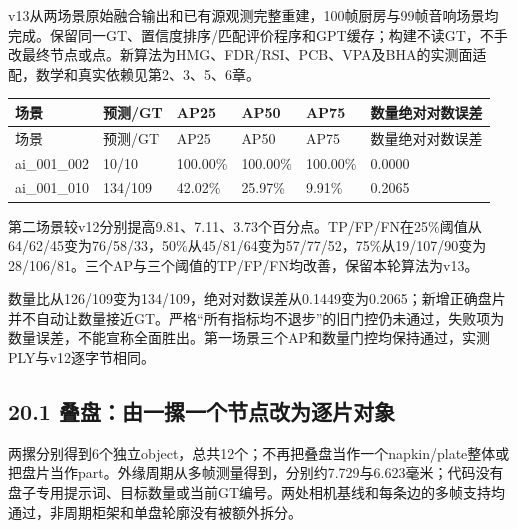 \documentclass[UTF8,fontset=fandol]{ctexart}
\begin{document}
v13从两场景原始融合输出和已有源观测完整重建，100帧厨房与99帧音响场景均完成。保留同一GT、置信度排序/匹配评价程序和GPT缓存；构建不读GT，不手改最终节点或点。新算法为HMG、FDR/RSI、PCB、VPA及BHA的实测面适配，数学和真实依赖见第2、3、5、6章。



{\small
\begin{longtable}{|p{}|p{}|p{}|p{}|p{}|p{}|}
\hline
场景 & 预测/GT & AP25 & AP50 & AP75 & 数量绝对对数误差 \\ \hline
\endfirsthead
\hline
场景 & 预测/GT & AP25 & AP50 & AP75 & 数量绝对对数误差 \\ \hline
\endhead
ai\_001\_002 & 10/10 & 100.00\% & 100.00\% & 100.00\% & 0.0000 \\ \hline
ai\_001\_010 & 134/109 & 42.02\% & 25.97\% & 9.91\% & 0.2065 \\ \hline
\end{longtable}
}

第二场景较v12分别提高9.81、7.11、3.73个百分点。TP/FP/FN在25\%阈值从64/62/45变为76/58/33，50\%从45/81/64变为57/77/52，75\%从19/107/90变为28/106/81。三个AP与三个阈值的TP/FP/FN均改善，保留本轮算法为v13。



数量比从126/109变为134/109，绝对对数误差从0.1449变为0.2065；新增正确盘片并不自动让数量接近GT。严格“所有指标均不退步”的旧门控仍未通过，失败项为数量误差，不能宣称全面胜出。第一场景三个AP和数量门控均保持通过，实测PLY与v12逐字节相同。



\subsection*{20.1 叠盘：由一摞一个节点改为逐片对象}

两摞分别得到6个独立object，总共12个；不再把叠盘当作一个napkin/plate整体或把盘片当作part。外缘周期从多帧测量得到，分别约7.729与6.623毫米；代码没有盘子专用提示词、目标数量或当前GT编号。两处相机基线和每条边的多帧支持均通过，非周期柜架和单盘轮廓没有被额外拆分。
\end{document}
